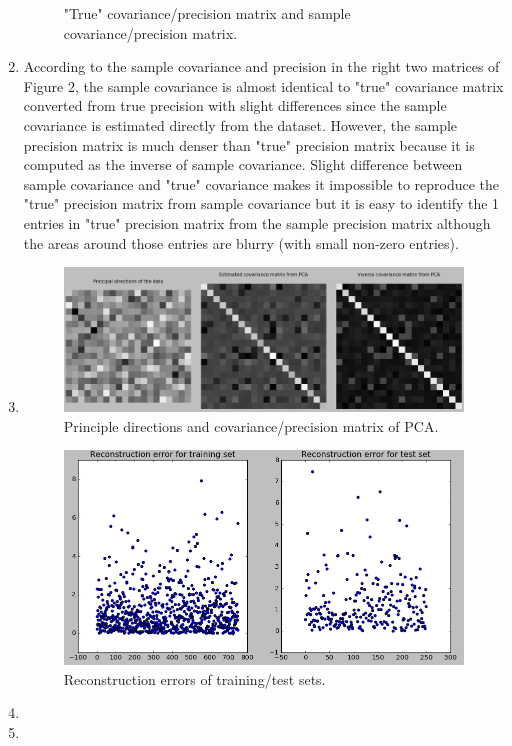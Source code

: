 \documentclass{article}
\begin{document}
\begin{enumerate}
\begin{figure}[h]
        \caption{"True" covariance/precision matrix and sample covariance/precision matrix.}
    \end{figure}
\item
    According to the sample covariance and precision in the right two matrices of Figure 2, the sample covariance is almost identical to "true" covariance matrix converted from true precision with slight differences since the sample covariance is estimated directly from the dataset. However, the sample precision matrix is much denser than "true" precision matrix because it is computed as the inverse of sample covariance. Slight difference between sample covariance and "true" covariance makes it impossible to reproduce the "true" precision matrix from sample covariance but it is easy to identify the 1 entries in "true" precision matrix from the sample precision matrix although the areas around those entries are blurry (with small non-zero entries).
\item
    \begin{figure}[h]
        \includegraphics[width=1.1\linewidth]{prin.png}
        \caption{Principle directions and covariance/precision matrix of PCA.}
    \end{figure}
    \begin{figure}[h]
        \includegraphics[width=.8\linewidth]{recon.png}
        \caption{Reconstruction errors of training/test sets.}
    \end{figure}
\item
\item

\end{enumerate}
\end{document}
